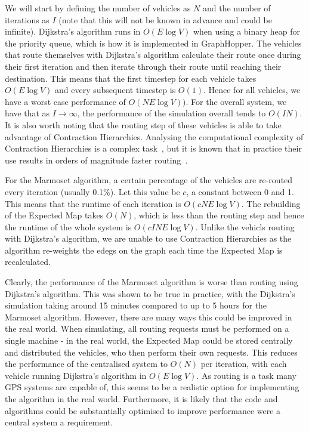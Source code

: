 \documentclass[ %
                    author={Alexander Hill},
                supervisor={Dr. Benjamin Sach},
                    degree={MEng},
                     title={MARMOSET},
                  subtitle={Multi-Agent Route Management using Online Simulation for Efficient Transportation},
                      type={research},
                      year={2016} ]{dissertation}
\begin{document}
We will start by defining the number of vehicles as $N$ and the number of
iterations as $I$ (note that this will not be known in advance and could be
infinite). Dijkstra's algorithm runs in $O(E \log V)$ when using a binary heap
for the priority queue, which is how it is implemented in GraphHopper. The
vehicles that route themselves with Dijkstra's algorithm calculate their route
once during their first iteration and then iterate through their route until
reaching their destination. This means that the first timestep for each vehicle
takes $O(E\log V)$ and every subsequent timestep is $O(1)$. Hence for all
vehicles, we have a worst case performance of $O(NE\log V))$. For the overall
system, we have that as $I \rightarrow \infty$, the performance of the
simulation overall tends to $O(IN)$. It is also worth noting that the routing
step of these vehicles is able to take advantage of Contraction Hierarchies.
Analysing the computational complexity of Contraction Hierarchies is a complex
task~\cite{ch-complexity}, but it is known that in practice their use results in
orders of magnitude faster routing~\cite{ch-perf}.

For the Marmoset algorithm, a certain percentage of the vehicles are re-routed
every iteration (usually 0.1\%). Let this value be $c$, a constant between 0 and
1. This means that the runtime of each iteration is $O(cNE\log V)$. The
rebuilding of the Expected Map takes $O(N)$, which is less than the routing step
and hence the runtime of the whole system is $O(cINE\log V)$. Unlike the vehicls
routing with Dijkstra's algorithm, we are unable to use Contraction Hierarchies
as the algorithm re-weights the edegs on the graph each time the Expected Map is
recalculated.

Clearly, the performance of the Marmoset algorithm is worse than routing using
Dijkstra's algorithm. This was shown to be true in practice, with the Dijkstra's
simulation taking around 15 minutes compared to up to 5 hours for the Marmoset
algorithm. However, there are many ways this could be improved in the real
world. When simulating, all routing requests must be performed on a single
machine - in the real world, the Expected Map could be stored centrally and
distributed the vehicles, who then perform their own requests. This reduces the
performance of the centralised system to $O(N)$ per iteration, with each vehicle
running Dijkstra's algorithm in $O(E\log V)$. As routing is a task many GPS
systems are capable of, this seems to be a realistic option for implementing the
algorithm in the real world. Furthermore, it is likely that the code and
algorithms could be substantially optimised to improve performance were a central
system a requirement.
\end{document}
